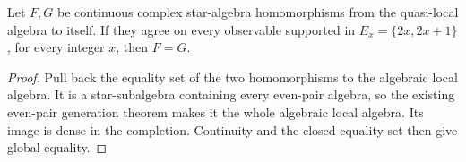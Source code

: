 \begin{lemma}
    \label{lem:qca_even_pair_hom_ext}
    \leanok
    Let $F,G$ be continuous complex star-algebra homomorphisms from the
    quasi-local algebra to itself. If they agree on every observable
    supported in $E_x=\{2x,2x+1\}$, for every integer $x$, then $F=G$.
\end{lemma}
\begin{proof}
    \leanok
    Pull back the equality set of the two homomorphisms to the algebraic
    local algebra. It is a star-subalgebra containing every even-pair
    algebra, so the existing even-pair generation theorem makes it the
    whole algebraic local algebra. Its image is dense in the completion.
    Continuity and the closed equality set then give global equality.
\end{proof}
